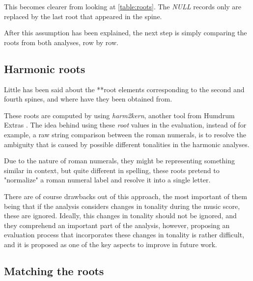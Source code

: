 		This becomes clearer from looking at \autoref{table:roots}. The \emph{NULL} records only are replaced by the last root that appeared in the spine.

		After this assumption has been explained, the next step is simply comparing the roots from both analyses, row by row.

	\subsection{Harmonic roots}
		Little has been said about the **root elements corresponding to the second and fourth spines, and where have they been obtained from.

		These roots are computed by using \emph{harm2kern}, another tool from Humdrum Extras \cite{humextra}. The idea behind using these \emph{root} values in the evaluation, instead of for example, a raw string comparison between the roman numerals, is to resolve the ambiguity that is caused by possible different tonalities in the harmonic analyses.

		Due to the nature of roman numerals, they might be representing something similar in context, but quite different in spelling, these roots pretend to "normalize" a roman numeral label and resolve it into a single letter.

		There are of course drawbacks out of this approach, the most important of them being that if the analysis considers changes in tonality during the music score, these are ignored. Ideally, this changes in tonality should not be ignored, and they comprehend an important part of the analysis, however, proposing an evaluation process that incorporates these changes in tonality is rather difficult, and it is proposed as one of the key aspects to improve in future work.

	\subsection{Matching the roots}

